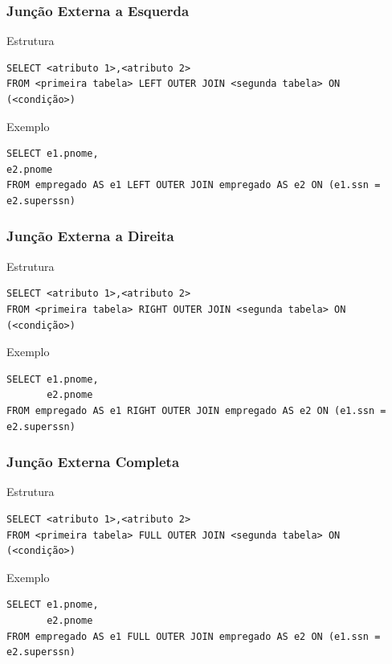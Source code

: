 \documentclass{beamer}
\begin{document}
\begin{frame}[fragile]
\frametitle{Junção Externa a Esquerda}

\begin{block}{Estrutura}
	\begin{lstlisting}
SELECT <atributo 1>,<atributo 2>
FROM <primeira tabela> LEFT OUTER JOIN <segunda tabela> ON (<condição>)
	\end{lstlisting}
\end{block}\vfill

\begin{exampleblock}{Exemplo}
	\begin{lstlisting}
SELECT e1.pnome,
e2.pnome
FROM empregado AS e1 LEFT OUTER JOIN empregado AS e2 ON (e1.ssn = e2.superssn)
	\end{lstlisting}
\end{exampleblock}
\end{frame}

\begin{frame}[fragile]
\frametitle{Junção Externa a Direita}

\begin{block}{Estrutura}
	\begin{lstlisting}
SELECT <atributo 1>,<atributo 2>
FROM <primeira tabela> RIGHT OUTER JOIN <segunda tabela> ON (<condição>)
	\end{lstlisting}
\end{block}\vfill

\begin{exampleblock}{Exemplo}
	\begin{lstlisting}
SELECT e1.pnome,
       e2.pnome
FROM empregado AS e1 RIGHT OUTER JOIN empregado AS e2 ON (e1.ssn = e2.superssn)
\end{lstlisting}
\end{exampleblock}
\end{frame}

\begin{frame}[fragile]
\frametitle{Junção Externa Completa}

\begin{block}{Estrutura}
	\begin{lstlisting}
SELECT <atributo 1>,<atributo 2>
FROM <primeira tabela> FULL OUTER JOIN <segunda tabela> ON (<condição>)
	\end{lstlisting}
\end{block}\vfill

\begin{exampleblock}{Exemplo}
	\begin{lstlisting}
SELECT e1.pnome,
       e2.pnome
FROM empregado AS e1 FULL OUTER JOIN empregado AS e2 ON (e1.ssn = e2.superssn)
	\end{lstlisting}
\end{exampleblock}
\end{frame}
\end{document}
